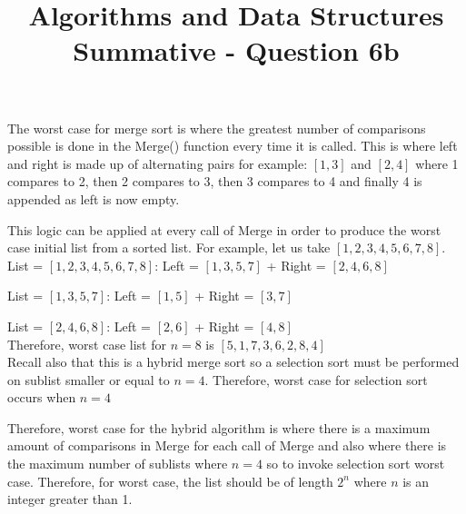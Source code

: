\documentclass[10pt,a4paper]{article}
\title{Algorithms and Data Structures Summative - Question 6b}
\begin{document}
	The worst case for merge sort is where the greatest number of comparisons possible is done in the Merge() function every time it is called.
	This is where left and right is made up of alternating pairs for example: $[1, 3]$ and $[2, 4]$ where 1 compares to 2, then 2 compares to 3, then 3 compares to 4 and finally
	4 is appended as left is now empty.
	
	This logic can be applied at every call of Merge in order to produce the worst case initial list from a sorted list. For example, let us take $[1, 2, 3, 4, 5, 6, 7, 8]$. \\
	
	List = $[1,2,3,4,5,6,7,8]$: Left = $[1,3,5,7]$ + Right = $[2,4,6,8]$
	
	List = $[1,3,5,7]$: Left = $[1,5]$ + Right = $[3,7]$
	
	List = $[2,4,6,8]$: Left = $[2,6]$ + Right = $[4,8]$\\
	
	Therefore, worst case list for $n=8$ is $[5,1,7,3,6,2,8,4]$ \\
	
	Recall also that this is a hybrid merge sort so a selection sort must be performed on sublist smaller or equal to $n=4$. Therefore, worst case for selection sort occurs when $n=4$
	
	Therefore, worst case for the hybrid algorithm is where there is a maximum amount of comparisons in Merge for each call of Merge and also where there is the maximum number of sublists where
	$n=4$ so to invoke selection sort worst case. Therefore, for worst case, the list should be of length $2^n$ where $n$ is an integer greater than 1.
\end{document}
